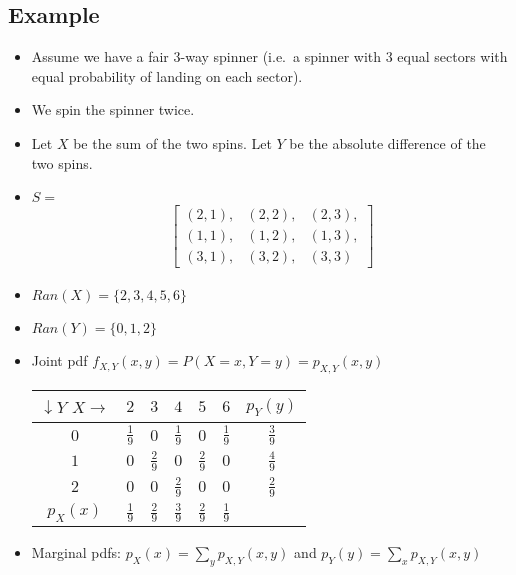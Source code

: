 \documentclass[12pt]{article}
\begin{document}
        \subsection{Example}
            \begin{itemize}
                \item Assume we have a fair 3-way spinner (i.e.\ a spinner with 3 equal sectors with equal probability of landing on each sector).
                \item We spin the spinner twice.
                \item Let $X$ be the sum of the two spins. Let $Y$ be the absolute difference of the two spins.
                \item $S = $
                \begin{align*}
                    \begin{bmatrix}
                        (2, 1), & (2, 2), & (2, 3), \\
                        (1, 1), & (1, 2), & (1, 3), \\
                        (3, 1), & (3, 2), & (3, 3)
                    \end{bmatrix}
                \end{align*}
                \item $Ran(X) = \{2, 3, 4, 5, 6\}$
                \item $Ran(Y) = \{0, 1, 2\}$
                \item Joint pdf $f_{X, Y}(x, y) = P(X = x, Y = y) = p_{X, Y}(x, y)$ \\
                \begin{tabular}{c|c|c|c|c|c|c}
                    \hline
                    $\downarrow{}Y$ $X\rightarrow$ & $2$ & $3$ & $4$ & $5$ & $6$ & $p_Y(y)$  \\
                    \hline
                    $0$ & $\frac{1}{9}$ & $0$ & $\frac{1}{9}$ & $0$ & $\frac{1}{9}$ & $\frac{3}{9}$ \\
                    \hline
                    $1$ & $0$ & $\frac{2}{9}$ & $0$ & $\frac{2}{9}$ & $0$ & $\frac{4}{9}$ \\
                    \hline
                    $2$ & $0$ & $0$ & $\frac{2}{9} $ & $0$ & $0$ & $\frac{2}{9}$ \\
                    \hline
                    $p_X(x)$ & $\frac{1}{9}$ & $\frac{2}{9}$ & $\frac{3}{9}$ & $\frac{2}{9}$ & $\frac{1}{9}$ & \\
                \end{tabular}
                \item Marginal pdfs: $p_X(x) = \sum_{y} p_{X, Y}(x, y)$ and $p_Y(y) = \sum_{x} p_{X, Y}(x, y)$
            \end{itemize}
\end{document}
